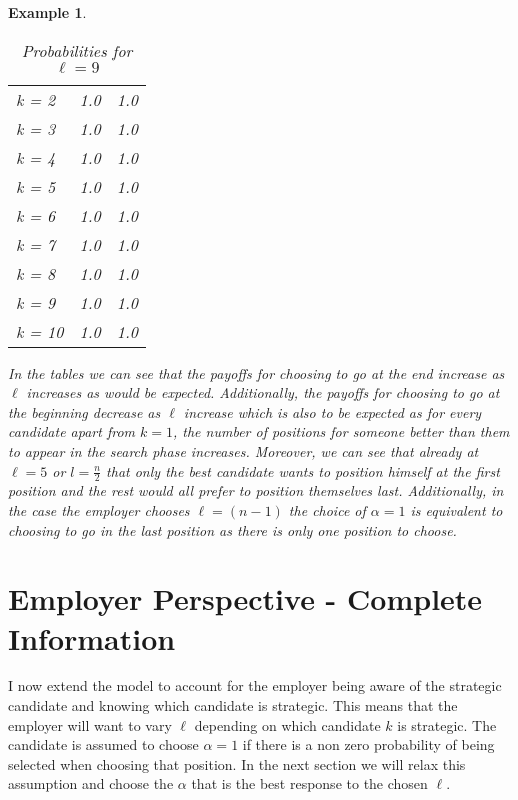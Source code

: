 \documentclass{article}
\newtheorem{example}{Example} %
\begin{document}
\begin{example}
\begin{table}[H]
\begin{minipage}{0.33\textwidth}
\begin{tabular}{lrr}
k = 2  &        1.0 &            1.0 \\
k = 3  &        1.0 &            1.0 \\
k = 4  &        1.0 &            1.0 \\
k = 5  &        1.0 &            1.0 \\
k = 6  &        1.0 &            1.0 \\
k = 7  &        1.0 &            1.0 \\
k = 8  &        1.0 &            1.0 \\
k = 9  &        1.0 &            1.0 \\
k = 10 &        1.0 &            1.0 \\
\hline
\end{tabular}
\caption{Probabilities for $\ell=9$}
\end{minipage}\hfill
\end{table}

In the tables we can see that the payoffs for choosing to go at the end increase as $\ell$ increases as would be expected. Additionally, the payoffs for choosing to go at the beginning decrease as $\ell$ increase which is also to be expected as for every candidate apart from $k=1$, the number of positions for someone better than them to appear in the search phase increases. Moreover,  we can see that already at $\ell=5$ or $l=\frac{n}{2}$ that only the best candidate wants to position himself at the first position and the rest would all prefer to position themselves last. Additionally, in the case the employer chooses $\ell=(n-1)$ the choice of $\alpha  = 1$ is equivalent to choosing to go in the last position as there is only one position to choose.
\end{example}

\section{Employer Perspective - Complete Information}

I now extend the model to account for the employer being aware of the strategic candidate and knowing which candidate is strategic. This means that the employer will want to vary $\ell$ depending on which candidate $k$ is strategic. The candidate is assumed to choose $\alpha =1$ if there is a non zero probability of being selected when choosing that position. In the next section we will relax this assumption and choose the $\alpha$ that is the best response to the chosen $\ell$.
\end{document}
